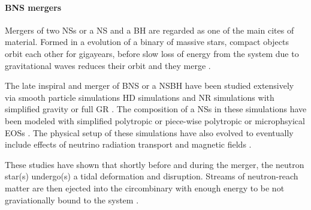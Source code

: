 \paragraph{\ac{BNS} mergers}

Mergers of two \acp{NS} or a \ac{NS} and a \ac{BH} are regarded as one of the main cites of \rproc{} material. Formed in a evolution of a binary of massive stars, compact objects orbit each other for gigayears, before slow loss of energy from the system due to gravitational waves reduces their orbit and they merge \citep{Hulse:1975,Lattimer:2004sa,Price:2006fi}. 

The late inspiral and merger of \ac{BNS} or a \ac{NSBH} have been studied extensively via smooth particle simulations \red{[REFS]} \ac{HD} simulations \red{[REFS]} and \ac{NR} simulations with simplified gravity \red{[REFS]} or full \ac{GR} \red{[REFS]}. The composition of a \acp{NS} in these simulations have been modeled with simplified polytropic \red{[REFS]} or piece-wise polytropic \red{[REFS]} or microphsyical \acp{EOS} \red{[REFS]}. The physical setup of these simulations have also evolved to eventually include effects of neutrino radiation transport \red{[REFS]} and magnetic fields \red{[REFS]}. 

These studies have shown that shortly before and during the merger, the neutron star(s) undergo(s) a tidal deformation and disruption. Streams of neutron-reach matter are then ejected into the circombinary with enough energy to be not graviationally bound to the system \citep{Price:2006fi,Foucart:2014nda,Sekiguchi:2015dma,Kyutoku:2015gda,Radice:2016dwd}. 

